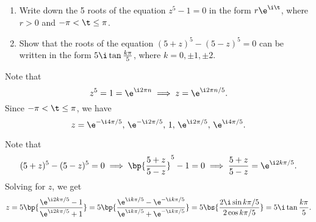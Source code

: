 \begin{problem}
    \begin{enumerate}
        \item Write down the 5 roots of the equation $z^5 - 1 = 0$ in the form $r\e^{\i\t}$, where $r > 0$ and $-\pi < \t \leq \pi$.
        \item Show that the roots of the equation $(5+z)^5 - (5-z)^5 = 0$ can be written in the form $5\i \tan \frac{k\pi}5$, where $k = 0, \pm 1, \pm 2.$
    \end{enumerate}
\end{problem}
\begin{solution}
    \begin{ppart}
        Note that \[z^5 = 1 = \e^{\i 2\pi n} \implies z = \e^{\i 2\pi n /5}.\] Since $- \pi < \t \leq \pi$, we have \[z = \e^{-\i 4\pi/5}, \, \e^{-\i 2\pi/5}, \, 1, \, \e^{\i 2\pi/5}, \, \e^{\i 4\pi/5}.\]
    \end{ppart}
    \begin{ppart}
        Note that \[(5+z)^5 - (5-z)^5 = 0 \implies \bp{\frac{5+z}{5-z}}^5 - 1 = 0 \implies \frac{5+z}{5-z} = \e^{\i2k\pi/5}.\] Solving for $z$, we get \[z = 5\bp{\frac{\e^{\i2k\pi/5} - 1}{\e^{\i2k\pi/5} + 1}} = 5\bp{\frac{\e^{\i k\pi/5} - \e^{-\i k\pi/5}}{\e^{\i k\pi/5} + \e^{-\i k\pi/5}}} = 5\bs{\frac{2\i \sin{k\pi/5}}{2\cos{k\pi/5}}} = 5\i\tan \frac{k\pi}5.\]
    \end{ppart}
\end{solution}

